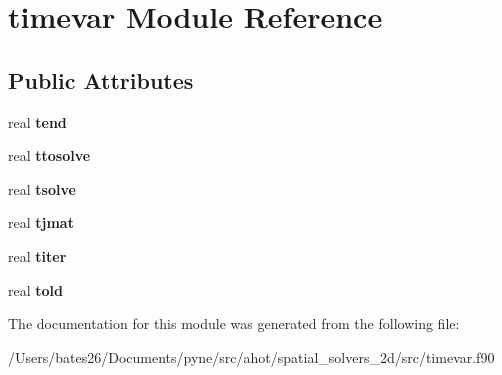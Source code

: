 \hypertarget{classtimevar}{\section{timevar Module Reference}
\label{classtimevar}
}
\subsection*{Public Attributes}
\begin{DoxyCompactItemize}
\item 
\hypertarget{classtimevar_a76d79f48bb04d878c1e66e9b09179181}{real {\bfseries tend}}\label{classtimevar_a76d79f48bb04d878c1e66e9b09179181}

\item 
\hypertarget{classtimevar_a154a69241e2e652b6a025650a2e903fe}{real {\bfseries ttosolve}}\label{classtimevar_a154a69241e2e652b6a025650a2e903fe}

\item 
\hypertarget{classtimevar_af710a2d90292754bfb0608b801729bc3}{real {\bfseries tsolve}}\label{classtimevar_af710a2d90292754bfb0608b801729bc3}

\item 
\hypertarget{classtimevar_ac142562bd2ebbe0b88a16b511c5a91d3}{real {\bfseries tjmat}}\label{classtimevar_ac142562bd2ebbe0b88a16b511c5a91d3}

\item 
\hypertarget{classtimevar_aa930b0267e96a826be5ba207aa8dae83}{real {\bfseries titer}}\label{classtimevar_aa930b0267e96a826be5ba207aa8dae83}

\item 
\hypertarget{classtimevar_af209975eea79e16faed013cf60c76a49}{real {\bfseries told}}\label{classtimevar_af209975eea79e16faed013cf60c76a49}

\end{DoxyCompactItemize}


The documentation for this module was generated from the following file\+:\begin{DoxyCompactItemize}
\item 
/\+Users/bates26/\+Documents/pyne/src/ahot/spatial\+\_\+solvers\+\_\+2d/src/timevar.\+f90\end{DoxyCompactItemize}
